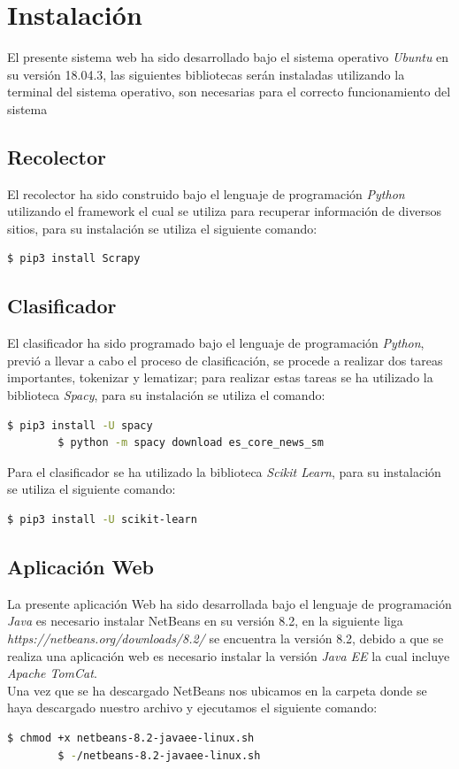 \section{Instalación}

	El presente sistema web ha sido desarrollado bajo el sistema operativo \textit{Ubuntu} en su versión 18.04.3, las siguientes bibliotecas serán instaladas utilizando la terminal del sistema operativo, son necesarias para el correcto funcionamiento del sistema
	\subsection{Recolector}
	El recolector ha sido construido bajo el lenguaje de programación \textit{Python} utilizando el framework  el cual se utiliza para recuperar información de diversos sitios, para su instalación se utiliza el siguiente comando:
	\begin{lstlisting}[language=bash]
  		$ pip3 install Scrapy
	\end{lstlisting}

	\subsection{Clasificador}
	El clasificador ha sido programado bajo el lenguaje de programación \textit{Python}, previó a llevar a cabo el proceso de clasificación, se procede a realizar dos tareas importantes, tokenizar y lematizar; para realizar estas tareas se ha utilizado la biblioteca \textit{Spacy}, para su instalación se utiliza el comando:
	\begin{lstlisting}[language=bash]
  		$ pip3 install -U spacy
  		$ python -m spacy download es_core_news_sm
	\end{lstlisting}

	Para el clasificador se ha utilizado la biblioteca \textit{Scikit Learn}, para su instalación se utiliza el siguiente comando:
	\begin{lstlisting}[language=bash]
		$ pip3 install -U scikit-learn
	\end{lstlisting}

	\subsection{Aplicación Web}
	La presente aplicación Web ha sido desarrollada bajo el lenguaje de programación \textit{Java} es necesario instalar NetBeans en su versión 8.2, en la siguiente liga \textit{https://netbeans.org/downloads/8.2/} se encuentra la versión 8.2, debido a que se realiza una aplicación web es necesario instalar la versión \textit{Java EE} la cual incluye \textit{Apache TomCat}.
	\\
	Una vez que se ha descargado NetBeans nos ubicamos en la carpeta donde se haya descargado nuestro archivo y ejecutamos el siguiente comando:
	\begin{lstlisting}[language=bash]
		$ chmod +x netbeans-8.2-javaee-linux.sh 
		$ -/netbeans-8.2-javaee-linux.sh 
	\end{lstlisting}

